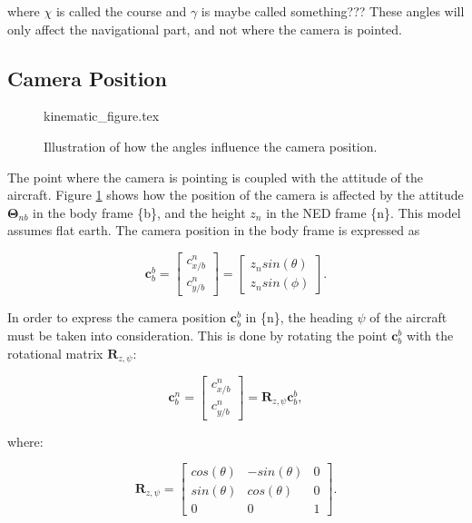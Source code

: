 where $\chi$ is called the course and $\gamma$ is maybe called something??? These angles will only affect the navigational part, and not where the camera is pointed.


\subsection{Camera Position}

\begin{figure}
	{kinematic_figure.tex}
	\caption{Illustration of how the angles influence the camera position.}
	\label{fig:camera_kinematics}
\end{figure}
	
The point where the camera is pointing is coupled with the attitude of the aircraft. Figure \ref{fig:camera_kinematics} shows how the position of the camera is affected by the attitude $\bm{\Theta}_{nb}$ in the body frame \{b\}, and the height $z_n$ in the NED frame \{n\}. This model assumes flat earth. The camera position in the body frame is expressed as

\begin{equation} \label{eq:camera_pos}
	\bm{c}_b^b =
	\begin{bmatrix}
		c_{x/b}^n \\
		c_{y/b}^n
	\end{bmatrix}
	=
	\begin{bmatrix}
		z_n sin(\theta) \\
		z_n sin(\phi)
	\end{bmatrix}.
\end{equation}

In order to express the camera position $\bm{c}_b^b$ in \{n\}, the heading $\psi$ of the aircraft must be taken into consideration. This is done by rotating the point $\bm{c}_b^b$ with the rotational matrix $\bm{R}_{z,\psi}$:

\begin{equation} \label{eq:body_ned_rotate}
	\bm{c}_b^n =
	\begin{bmatrix}
		c_{x/b}^n \\
		c_{y/b}^n
	\end{bmatrix}
	= \bm{R}_{z,\psi} \bm{c}_b^b,
\end{equation}

where:

\begin{equation}
	\bm{R}_{z,\psi} = 
	\begin{bmatrix}
		cos(\theta) & -sin(\theta) & 0 \\
		sin(\theta) & cos(\theta) & 0 \\
		0 & 0 & 1
	\end{bmatrix}.
\end{equation}

